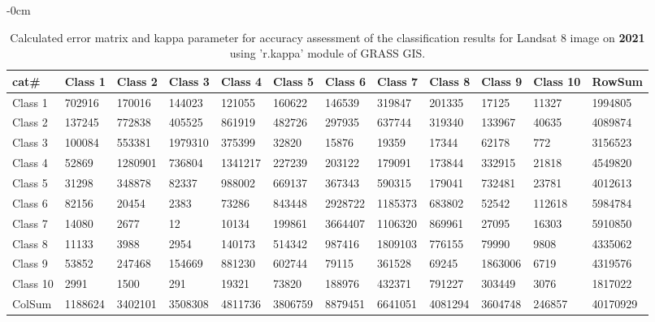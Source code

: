 \documentclass[sustainability,article,submit,pdftex,moreauthors]{Definitions/mdpi}
\begin{document}
\begin{table}[H] 
\footnotesize
    \centering
    \begin{adjustwidth}{-\extralength}{0cm}
    \caption{Calculated error matrix and kappa parameter for accuracy assessment of the classification results for Landsat 8 image on \textbf{2021} using 'r.kappa' module of GRASS GIS.\label{tab03}}
 	\begin{tabularx}{\fulllength}{|l|l|l|l|l|l|l|l|l|l|l|l|}
    \toprule
                \textbf{cat\#} & \textbf{Class 1} & \textbf{Class 2} & \textbf{Class 3} & \textbf{Class 4} & \textbf{Class 5} & \textbf{Class 6} & \textbf{Class 7} & \textbf{Class 8} & \textbf{Class 9} & \textbf{Class 10} & \textbf{RowSum} \\ \hline
        Class 1 & \cellcolor{green!20}702916 & 170016 & 144023 & 121055 & 160622 & 146539 & 319847 & 201335 & 17125 & 11327 & 1994805 \\ \hline
        Class 2 & 137245 & \cellcolor{green!20}772838 & 405525 & 861919 & 482726 & 297935 & 637744 & 319340 & 133967 & 40635 & 4089874 \\ \hline
        Class 3 & 100084 & 553381 & \cellcolor{green!20}1979310 & 375399 & 32820 & 15876 & 19359 & 17344 & 62178 & 772 & 3156523 \\ \hline
        Class 4 & 52869 & 1280901 & 736804 & \cellcolor{green!20}1341217 & 227239 & 203122 & 179091 & 173844 & 332915 & 21818 & 4549820 \\ \hline
        Class 5 & 31298 & 348878 & 82337 & 988002 & \cellcolor{green!20}669137 & 367343 & 590315 & 179041 & 732481 & 23781 & 4012613 \\ \hline
        Class 6 & 82156 & 20454 & 2383 & 73286 & 843448 & \cellcolor{green!20}2928722 & 1185373 & 683802 & 52542 & 112618 & 5984784 \\ \hline
        Class 7 & 14080 & 2677 & 12 & 10134 & 199861 & 3664407 & \cellcolor{green!20}1106320 & 869961 & 27095 & 16303 & 5910850 \\ \hline
        Class 8 & 11133 & 3988 & 2954 & 140173 & 514342 & 987416 & 1809103 & \cellcolor{green!20}776155 & 79990 & 9808 & 4335062 \\ \hline
        Class 9 & 53852 & 247468 & 154669 & 881230 & 602744 & 79115 & 361528 & 69245 & \cellcolor{green!20}1863006 & 6719 & 4319576 \\ \hline
        Class 10 & 2991 & 1500 & 291 & 19321 & 73820 & 188976 & 432371 & 791227 & 303449 & \cellcolor{green!20}3076 & 1817022 \\ \hline
        ColSum & 1188624 & 3402101 & 3508308 & 4811736 & 3806759 & 8879451 & 6641051 & 4081294 & 3604748 & 246857 & \cellcolor{green!20}40170929 \\ \hline        \bottomrule
    \end{tabularx}
    \end{adjustwidth}
\end{table}
\end{document}
